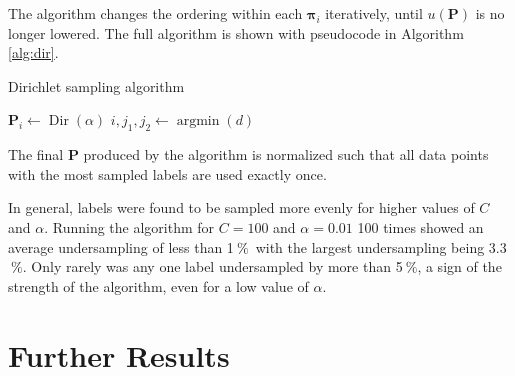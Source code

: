 \documentclass{article}
\newcommand{\unit}[1]{\ensuremath{\:\text{#1}}}
\newcommand{\pro}{\ensuremath{\unit{\%{}}}}
\begin{document}
The algorithm changes the ordering within each $\bm\pi_i$ iteratively, until $u(\mathbf P)$ is no longer lowered.
The full algorithm is shown with pseudocode in Algorithm \ref{alg:dir}.
\begin{algorithm}
\caption{Dirichlet sampling algorithm}
\label{alg:dir}
\begin{algorithmic}
    \State $\mathbf P_i \gets \operatorname{Dir}(\alpha)$
\EndFor
\Loop
        \EndFor
    \EndFor
        \State $ i, j_1, j_2 \gets \operatorname{argmin}(d) $
    \Else
    \EndIf
\EndLoop
{}
\end{algorithmic}
\end{algorithm}
The final $\mathbf P$ produced by the algorithm is normalized such that all data points with the most sampled labels are used exactly once.

In general, labels were found to be sampled more evenly for higher values of $C$ and $\alpha$.
Running the algorithm for $C=100$ and $\alpha=0.01$ 100 times showed an average undersampling of less than 1\pro\ with the largest undersampling being 3.3\pro.
Only rarely was any one label undersampled by more than 5\pro, a sign of the strength of the algorithm, even for a low value of $\alpha$.

\section{Further Results}%
\end{document}

